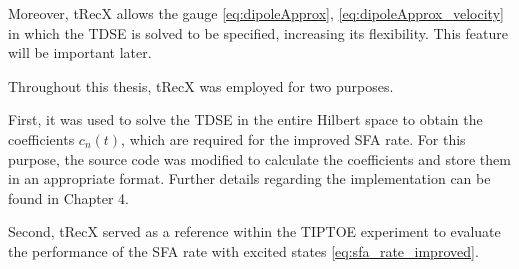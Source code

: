 Moreover, tRecX allows the gauge \eqref{eq:dipoleApprox}, \eqref{eq:dipoleApprox_velocity} in which the TDSE is solved to be specified, increasing its flexibility.
This feature will be important later.

\medskip
Throughout this thesis, tRecX was employed for two purposes.

First, it was used to solve the TDSE in the entire Hilbert space to obtain the coefficients $c_n(t)$, which are required for the improved SFA rate.
For this purpose, the source code was modified to calculate the coefficients and store them in an appropriate format.
Further details regarding the implementation can be found in Chapter 4.

Second, tRecX served as a reference within the TIPTOE experiment to evaluate the performance of the SFA rate with excited states \eqref{eq:sfa_rate_improved}.





